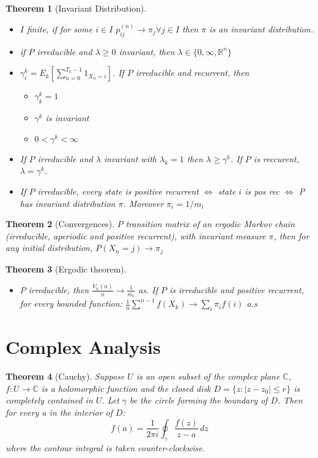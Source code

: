 \documentclass{article}
\newtheorem{theorem}{Theorem}
\begin{document}
\begin{theorem}[Invariant Distribution]
  \begin{itemize}
  \item $I$ finite, if for some $i \in I$ $p_{ij}^{(n)} \rightarrow \pi_j \forall j \in I$ then $\pi$ is an invariant distribution.
  \item if $P$ irreducible and $\lambda \ge 0$ invariant, then $\lambda \in \{0, \infty, \mathbb R^n\}$
  \item $\gamma_i^k = E_k [\sum^{T_k-1}_{n = 0} 1_{X_n = i}]$.
    If $P$ irreducible and recurrent, then
    \begin{itemize}
    \item $\gamma_k^k = 1$
    \item $\gamma^k$ is invariant
    \item $0 < \gamma^k < \infty$
    \end{itemize}
  \item If $P$ irreducible and $\lambda$ invariant with $\lambda_k = 1$ then $\lambda \ge \gamma^k$. If $P$ is reccurent, $\lambda = \gamma^k$.
  \item If $P$ irreducible, every state is positive recurrent $\iff$ state $i$ is pos rec $\iff$ P has invariant distribution $\pi$. Moreover $\pi_i = 1/m_i$
  \end{itemize}
\end{theorem}
\begin{theorem}[Convergences]
  $P$ transition matrix of an ergodic Markov chain (irreducible, aperiodic and positive recurrent), with invariant measure $\pi$, then for any initial distribution, $P(X_n = j) \rightarrow \pi_j$
\end{theorem}
\begin{theorem}[Ergodic theorem]
  \begin{itemize}
  \item $P$ irreducible, then $\frac{V_n(n)}{n} \rightarrow \frac{1}{m_i}$ as.
    If $P$ is irreducible and positive recurrent, for every bounded function:
    $\frac{1}{n} \sum^{n-1} f(X_k) \rightarrow \sum_i \pi_i f(i)$ a.s 
  \end{itemize}

\end{theorem}

\section{Complex Analysis}

\begin{theorem}[Cauchy]
  Suppose $U$ is an open subset of the complex plane $\mathbb C$,
  $f : U \rightarrow \mathbb C$ is a holomorphic function and the
  closed disk $D = \{ z: |z-z_0| \le r\}$ is completely contained
  in $U$. Let $\gamma$ be the circle forming the boundary of $D$. Then
  for every a in the interior of $D$:
$$f(a) = \frac{1}{2\pi i} \oint_\gamma \frac{f(z)}{z-a}\, dz $$
where the contour integral is taken counter-clockwise.
\end{theorem}
\end{document}
